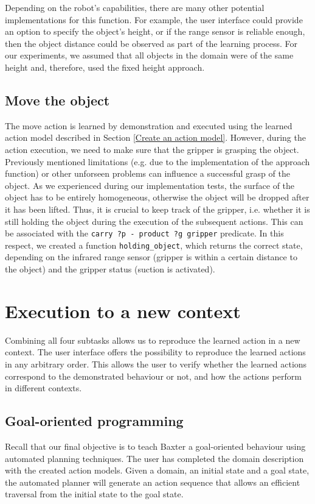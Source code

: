 Depending on the robot's capabilities, there are many other potential implementations for this function.
For example, the user interface could provide an option to specify the object's height, or if the range sensor is reliable enough, then the object distance could be observed as part of the learning process.
For our experiments, we assumed that all objects in the domain were of the same height and, therefore, used the fixed height approach.


\subsection{Move the object}\label{holdingObject}
The move action is learned by demonstration and executed using the learned action model described in Section \ref{Create an action model}.
However, during the action execution, we need to make sure that the gripper is grasping the object.
Previously mentioned limitations (e.g.
due to the implementation of the approach function) or other unforseen problems can influence a successful grasp of the object.
As we experienced during our implementation tests, the surface of the object has to be entirely homogeneous, otherwise the object will be dropped after it has been lifted.
Thus, it is crucial to keep track of the gripper, i.e.
whether it is still holding the object during the execution of the subsequent actions.
This can be associated with the \texttt{carry ?p - product ?g gripper} predicate.
In this respect, we created a function \texttt{holding_object}, which returns the correct state, depending on the infrared range sensor (gripper is within a certain distance to the object) and the gripper status (suction is activated).

\section{Execution to a new context}
Combining all four subtasks allows us to reproduce the learned action in a new context.
The user interface offers the possibility to reproduce the learned actions in any arbitrary order.
This allows the user to verify whether the learned actions correspond to the demonstrated behaviour or not, and how the actions perform in different contexts.

\subsection{Goal-oriented programming}
Recall that our final objective is to teach Baxter a goal-oriented behaviour using automated planning techniques.
The user has completed the domain description with the created action models.
Given a domain, an initial state and a goal state, the automated planner will generate an action sequence that allows an efficient traversal from the initial state to the goal state.

